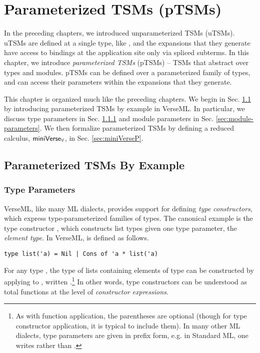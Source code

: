 
\chapter{Parameterized TSMs (pTSMs)}\label{chap:ptsms}
In the preceding chapters, we introduced unparameterized TSMs (uTSMs). uTSMs are defined at a single type, like , and the expansions that they generate have access to bindings at the application site only via spliced subterms. In this chapter, we introduce \emph{parameterized TSMs} (pTSMs) -- TSMs that abstract over types and modules. pTSMs can be defined over a parameterized family of types, and can access their parameters within the expansions that they generate. 

This chapter is organized much like the preceding chapters. We begin in Sec. \ref{sec:parameterized-tsms-by-example} by introducing parameterized TSMs by example in VerseML. In particular, we discuss type parameters in Sec. \ref{sec:type-parameters} and module parameters in Sec. \ref{sec:module-parameters}. We then formalize parameterized TSMs by defining a reduced calculus, $\mathsf{miniVerse}_\mathbf{\forall}$, in Sec. \ref{sec:miniVerseP}.
\section{Parameterized TSMs By Example}\label{sec:parameterized-tsms-by-example}

\subsection{Type Parameters}\label{sec:type-parameters}
VerseML, like many ML dialects, provides support for defining \emph{type constructors}, which express type-parameterized families of types. The canonical example is the type constructor , which constructs list types given one type parameter, the \emph{element type}. 
In VerseML,  is defined as follows.
\begin{lstlisting}[numbers=none]
type list('a) = Nil | Cons of 'a * list('a)
\end{lstlisting}

For any type , the type of lists containing elements of type  can be constructed by applying  to , written .\footnote{As with function application, the parentheses are optional (though for type constructor application, it is typical to include them). In many other ML dialects, type parameters are given in prefix form, e.g. in Standard ML, one writes  rather than .} In other words, type constructors can be understood as total functions at the level of \emph{constructor expressions}. 

